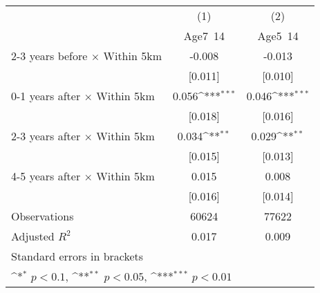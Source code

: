 {
\def\sym#1{\ifmmode^{#1}\else\(^{#1}\)\fi}
\begin{tabular}{l*{2}{c}}
\hline\hline
                    &\multicolumn{1}{c}{(1)}&\multicolumn{1}{c}{(2)}\\
                    &\multicolumn{1}{c}{Age7~14}&\multicolumn{1}{c}{Age5~14}\\
\hline
2-3 years before $\times$ Within 5km&      -0.008         &      -0.013         \\
                    &     [0.011]         &     [0.010]         \\
0-1 years after $\times$ Within 5km&       0.056\sym{***}&       0.046\sym{***}\\
                    &     [0.018]         &     [0.016]         \\
2-3 years after $\times$ Within 5km&       0.034\sym{**} &       0.029\sym{**} \\
                    &     [0.015]         &     [0.013]         \\
4-5 years after $\times$ Within 5km&       0.015         &       0.008         \\
                    &     [0.016]         &     [0.014]         \\
\hline
Observations        &       60624         &       77622         \\
Adjusted \(R^{2}\)  &       0.017         &       0.009         \\
\hline\hline
\multicolumn{3}{l}{\footnotesize Standard errors in brackets}\\
\multicolumn{3}{l}{\footnotesize \sym{*} \(p<0.1\), \sym{**} \(p<0.05\), \sym{***} \(p<0.01\)}\\
\end{tabular}
}
